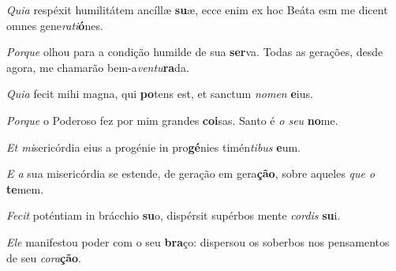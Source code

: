 \begin{greenumerate}
  \setcounter{enumi}{1}


  \item \textit{Quia} respéxit humilitátem ancíllæ \textbf{su}æ, {\GreStar} ecce enim ex hoc Beáta esm me dicent omnes gene\textit{rati}\textbf{ó}nes. \\ 

  \switchcolumn\setcounter{enumi}{1}

  \item \textit{Porque} olhou para a condição humilde de sua \textbf{ser}va. {\GreStar} Todas as gerações, desde agora, me chamarão bem-a\textit{ventu}\-\textbf{ra}\-da. 

  \switchcolumn*


  \item \textit{Quia} fecit mihi magna, qui \textbf{po}tens est, {\GreStar} et sanctum \textit{nomen} \textbf{e}ius. 

  \switchcolumn%

  \item \textit{Porque} o Poderoso fez por mim grandes \textbf{coi}sas. {\GreStar} Santo é \textit{o seu} \textbf{no}me. 

  \switchcolumn*


  \item \textit{Et mi}sericórdia eius a progénie in pro\textbf{gé}nies {\GreStar} timén\textit{tibus} \textbf{e}um. 

  \switchcolumn%

  \item \textit{E a} sua misericórdia se estende, de geração em gera\-\textbf{ção}, {\GreStar} sobre aqueles \textit{que o} \textbf{te}mem. 

  \switchcolumn*


  \item \textit{Fecit} poténtiam in brácchio \textbf{su}o, {\GreStar} dispérsit supérbos mente \textit{cordis} \textbf{su}i. 

  \switchcolumn%

  \item \textit{Ele} manifestou poder com o seu \textbf{bra}ço: {\GreStar} dispersou os soberbos nos pensamentos de seu \textit{cora}\textbf{ção}. 


\end{greenumerate}
